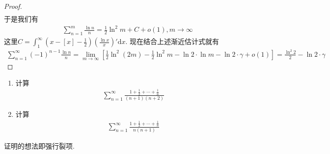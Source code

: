 \documentclass[../../main.tex]{subfiles}%
\begin{document}
\begin{proof}
\begin{align*}
\end{align*}
于是我们有
\begin{align*}
\sum_{n=1}^{m} \frac{\ln n}{n} = \frac{1}{2} \ln^2 m + C + o(1), m \to \infty
\end{align*}
这里$C = \int_{1}^{\infty} \left( x - [x] - \frac{1}{2} \right) \left( \frac{\ln x}{x} \right)' \mathrm{d}x$. 现在结合上述渐近估计式就有
\begin{align*}
\sum_{n=1}^{\infty} (-1)^{n - 1} \frac{\ln n}{n} = \lim_{m \to \infty} \left[ \frac{1}{2} \ln^2 (2m) - \frac{1}{2} \ln^2 m - \ln 2 \cdot \ln m - \ln 2 \cdot \gamma + o(1) \right] = \frac{\ln^2 2}{2} - \ln 2 \cdot \gamma
\end{align*}
\end{proof}

\begin{example}
\begin{enumerate}
\item 计算
\begin{align*}
\sum_{n=1}^{\infty} \frac{1 + \frac{1}{2} + \cdots + \frac{1}{n}}{(n + 1)(n + 2)}
\end{align*}

\item 计算
\begin{align*}
\sum_{n=1}^{\infty} \frac{1 + \frac{1}{2} + \cdots + \frac{1}{n}}{n(n + 1)}
\end{align*}
\end{enumerate}
\end{example}
\begin{note}
证明的想法即强行裂项.
\end{note}
\end{document}
